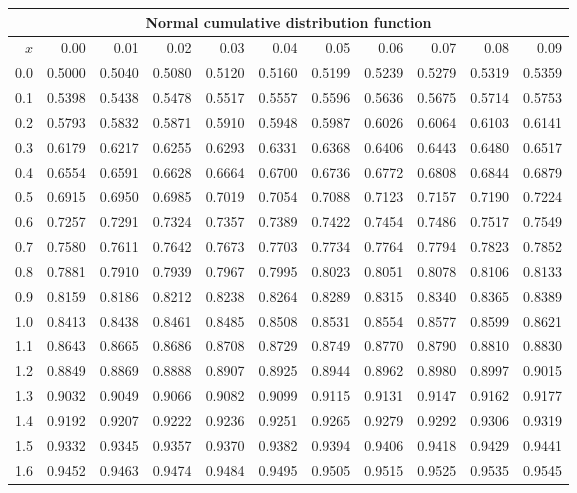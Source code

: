 \documentclass[10pt]{article}
\begin{document}
\vspace{1cm}
\begin{center}
    \begin{tabular}{|r|r@{\ }r@{\ }r@{\ }r@{\ }r@{\ }r@{\ }r@{\ }r@{\ }r@{\ }r@{\ }|}
    \hline
    \multicolumn{11}{|c|}{Normal cumulative distribution function}\\
    \hline
    \hline
    $x$&0.00&0.01&0.02&0.03&0.04&0.05&0.06&0.07&0.08&0.09\\
    \hline
    0.0&0.5000&0.5040&0.5080&0.5120&0.5160&0.5199&0.5239&0.5279&0.5319&0.5359\\
    \hline
    0.1&0.5398&0.5438&0.5478&0.5517&0.5557&0.5596&0.5636&0.5675&0.5714&0.5753\\
    \hline
    0.2&0.5793&0.5832&0.5871&0.5910&0.5948&0.5987&0.6026&0.6064&0.6103&0.6141\\
    \hline
    0.3&0.6179&0.6217&0.6255&0.6293&0.6331&0.6368&0.6406&0.6443&0.6480&0.6517\\
    \hline
    0.4&0.6554&0.6591&0.6628&0.6664&0.6700&0.6736&0.6772&0.6808&0.6844&0.6879\\
    \hline
    0.5&0.6915&0.6950&0.6985&0.7019&0.7054&0.7088&0.7123&0.7157&0.7190&0.7224\\
    \hline
    0.6&0.7257&0.7291&0.7324&0.7357&0.7389&0.7422&0.7454&0.7486&0.7517&0.7549\\
    \hline
    0.7&0.7580&0.7611&0.7642&0.7673&0.7703&0.7734&0.7764&0.7794&0.7823&0.7852\\
    \hline
    0.8&0.7881&0.7910&0.7939&0.7967&0.7995&0.8023&0.8051&0.8078&0.8106&0.8133\\
    \hline
    0.9&0.8159&0.8186&0.8212&0.8238&0.8264&0.8289&0.8315&0.8340&0.8365&0.8389\\
    \hline
    1.0&0.8413&0.8438&0.8461&0.8485&0.8508&0.8531&0.8554&0.8577&0.8599&0.8621\\
    \hline
    1.1&0.8643&0.8665&0.8686&0.8708&0.8729&0.8749&0.8770&0.8790&0.8810&0.8830\\
    \hline
    1.2&0.8849&0.8869&0.8888&0.8907&0.8925&0.8944&0.8962&0.8980&0.8997&0.9015\\
    \hline
    1.3&0.9032&0.9049&0.9066&0.9082&0.9099&0.9115&0.9131&0.9147&0.9162&0.9177\\
    \hline
    1.4&0.9192&0.9207&0.9222&0.9236&0.9251&0.9265&0.9279&0.9292&0.9306&0.9319\\
    \hline
    1.5&0.9332&0.9345&0.9357&0.9370&0.9382&0.9394&0.9406&0.9418&0.9429&0.9441\\
    \hline
    1.6&0.9452&0.9463&0.9474&0.9484&0.9495&0.9505&0.9515&0.9525&0.9535&0.9545\\

\end{tabular}
\end{center}
\end{document}
